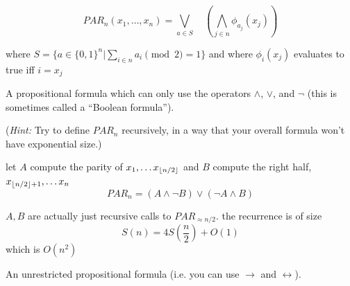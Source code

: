 \documentclass[11pt]{article}
\begin{document}
\begin{qunlist}
\begin{qparts}
    \begin{answer}

      \begin{equation}
        PAR_n(x_1, \dots, x_n) = \bigvee_{a\in S} \quad\left( \bigwedge_{j\in n }\phi_{a_j}(x_j) \right)
      \end{equation}

      where \(S=\{a\in \{0,1\}^n|\sum_{i\in n} a_i\pmod 2 = 1\}\) and
      where \(\phi_i(x_j)\) evaluates to true iff \(i=x_j\)

    \end{answer}

  \item
    A propositional formula which can only use the operators $\land$, $\lor$, and $\lnot$ (this is sometimes called a ``Boolean formula'').

    (\emph{Hint:} Try to define $PAR_n$ recursively, in a way that your overall formula won't have exponential size.)

    \begin{answer}

      let \(A\) compute the parity of \(x_1,\dots x_{\lfloor n/2 \rfloor}\) and \(B\) compute the right half, \(x_{\lfloor n/2 \rfloor+1},\dots x_n\)
      $$PAR_n = (A \land \lnot B) \lor (\lnot A \land B)$$

      \(A, B\) are actually just recursive calls to \(PAR_{\approx n/2}\). the recurrence is of size
      $$S(n) = 4S\left(\frac{n}{2}\right) + O(1)$$
      which is \(O(n^2)\)




    \end{answer}

  \item
    An unrestricted propositional formula (i.e. you can use $\rightarrow$ and $\leftrightarrow$).


\end{qparts}
\end{qunlist}
\end{document}
